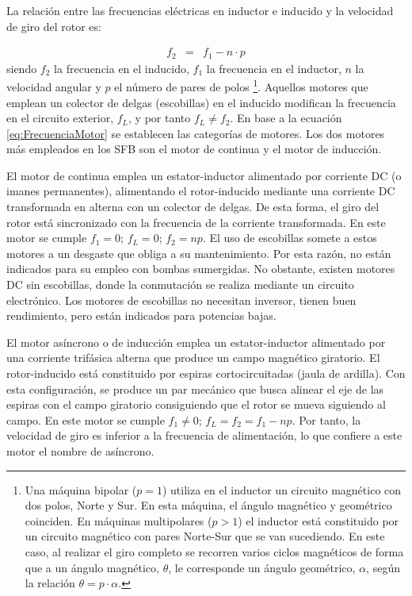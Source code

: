 La relación entre las frecuencias eléctricas en inductor e inducido
y la velocidad de giro del rotor es:

\begin{eqnarray}
f_{2} & = & f_{1}-n\cdot p\label{eq:FrecuenciaMotor}\end{eqnarray}
siendo $f_{2}$ la frecuencia en el inducido, $f_{1}$ la frecuencia
en el inductor, $n$ la velocidad angular y $p$ el número de pares
de polos%
\footnote{Una máquina bipolar ($p=1$) utiliza en el inductor un circuito magnético
con dos polos, Norte y Sur. En esta máquina, el ángulo magnético y
geométrico coinciden. En máquinas multipolares ($p>1$) el inductor
está constituido por un circuito magnético con pares Norte-Sur que
se van sucediendo. En este caso, al realizar el giro completo se recorren
varios ciclos magnéticos de forma que a un ángulo magnético, $\theta$,
le corresponde un ángulo geométrico, $\alpha$, según la relación
$\theta=p\cdot\alpha$.%
}. Aquellos motores que emplean un colector de delgas (escobillas)
en el inducido modifican la frecuencia en el circuito exterior, $f_{L}$,
y por tanto $f_{L}\neq f_{2}$. En base a la ecuación \ref{eq:FrecuenciaMotor}
se establecen las categorías de motores. Los dos motores más empleados
en los SFB son el motor de continua y el motor de inducción.

El motor de continua emplea un estator-inductor alimentado por corriente
DC (o imanes permanentes), alimentando el rotor-inducido mediante
una corriente DC transformada en alterna con un colector de delgas.
De esta forma, el giro del rotor está sincronizado con la frecuencia
de la corriente transformada. En este motor se cumple $f_{1}=0$;
$f_{L}=0$; $f_{2}=np$. El uso de escobillas somete a estos motores
a un desgaste que obliga a su mantenimiento. Por esta razón, no están
indicados para su empleo con bombas sumergidas. No obstante, existen
motores DC sin escobillas, donde la conmutación se realiza mediante
un circuito electrónico. Los motores de escobillas no necesitan inversor,
tienen buen rendimiento, pero están indicados para potencias bajas.

El motor asíncrono o de inducción emplea un estator-inductor alimentado
por una corriente trifásica alterna que produce un campo magnético
giratorio. El rotor-inducido está constituido por espiras cortocircuitadas
(jaula de ardilla). Con esta configuración, se produce un par mecánico
que busca alinear el eje de las espiras con el campo giratorio consiguiendo
que el rotor se mueva siguiendo al campo. En este motor se cumple
$f_{1}\neq0$; $f_{L}=f_{2}=f_{1}-np$. Por tanto, la velocidad de
giro es inferior a la frecuencia de alimentación, lo que confiere
a este motor el nombre de asíncrono.

